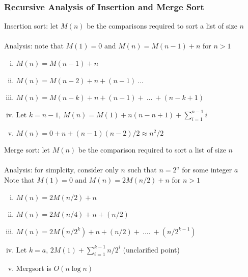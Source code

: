 \documentclass{article}
\begin{document}
			\subsubsection{Recursive Analysis of Insertion and Merge Sort}
				Insertion sort: let $M(n)$ be the comparisons required to sort a list of size $n$ \\
				\\
				Analysis: note that $M(1) = 0$ and $M(n) = M(n - 1) + n$ for $n > 1$
				\begin{enumerate}[(i)]
					\item $M(n) = M(n - 1) + n$
					\item $M(n) = M(n - 2) + n + (n - 1)\:...$
					\item $M(n) = M(n - k) + n + (n - 1) +\:...\:+ (n - k + 1)$
					\item Let $k = n - 1$, $M(n) = M(1) + n(n - n + 1) + \sum_{i = 1}^{n - 1}i$
					\item $M(n) = 0 + n + (n - 1)(n - 2)/2 \approx n^2/2$
					\end{enumerate}
				Merge sort: let $M(n)$ be the comparison required to sort a list of size $n$ \\
				\\
				Analysis: for simplcity, consider only $n$ such that $n = 2^a$ for some integer $a$ \\
				Note that $M(1) = 0$ and $M(n) = 2M(n/2) + n$ for $n > 1$
				\begin{enumerate}[(i)]
				 	\item $M(n) = 2M(n/2) + n$
				 	\item $M(n) = 2M(n/4) + n + (n/2)$
				 	\item $M(n) = 2M(n/2^k) + n + (n/2) +\:....\:+ (n/2^{k - 1})$
				 	\item Let $k = a$, $2M(1) + \sum_{i = 1}^{k - 1} n/2^i$ (unclarified point)
				 	\item Mergsort is $O(n \log n)$
				 	\end{enumerate}
\end{document}

